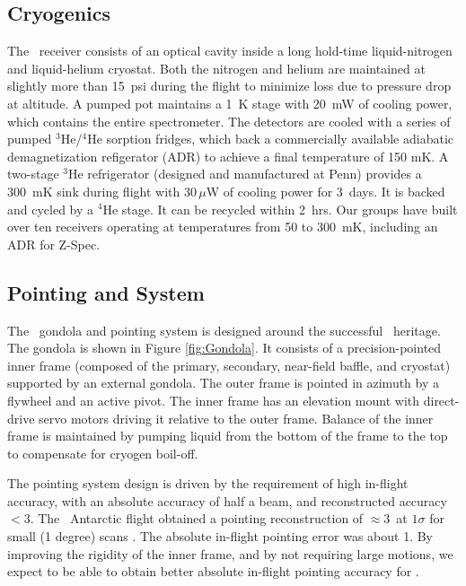 \subsection{Cryogenics} 
 
The \name\ receiver consists of an optical cavity inside a long
hold-time liquid-nitrogen and liquid-helium cryostat.  Both the
nitrogen and helium are maintained at slightly more than 15~psi during
the flight to minimize loss due to pressure drop at altitude.  A pumped pot maintains a 1~K stage with 20~mW of cooling power, which contains the entire spectrometer.  The detectors are cooled with a series of pumped $^3$He/$^4$He sorption fridges, which back a commercially available adiabatic demagnetization refigerator (ADR) to achieve a final temperature of 150 mK.
A two-stage $^3$He refrigerator (designed and manufactured at Penn) provides a
300~mK sink during flight with $30\,\mu$W of cooling power for 3~days.  It is backed and cycled by a $^4$He stage.  It can be recycled within
2~hrs.  Our groups have built over ten
receivers operating at temperatures from 50 to 300~mK, including an ADR for Z-Spec.

\subsection{Pointing and System} 
\label{sec:Observing} 

The \name\ gondola and pointing system is designed around the
successful \blast\ heritage.  The gondola is shown in Figure
\ref{fig:Gondola}.  It consists of a precision-pointed inner frame
(composed of the primary, secondary, near-field baffle, and cryostat)
supported by an external gondola.  The outer frame is pointed in
azimuth by a flywheel and an active pivot. The inner frame has an
elevation mount with direct-drive servo motors driving it relative to
the outer frame.  Balance of the inner frame is maintained by pumping
liquid from the bottom of the frame to the top to compensate for
cryogen boil-off.

The pointing system design is driven by the requirement of high
in-flight accuracy, with an absolute accuracy of half a beam, and
reconstructed accuracy $<$3\arcsec.  The \blast\ Antarctic flight
obtained a pointing reconstruction of $\approx 3$\arcsec\ at $1\sigma$
for small (1 degree) scans .  The absolute in-flight
pointing error was about 1\arcmin.  By improving the rigidity of the
inner frame, and by not requiring large motions, we expect to be able
to obtain better absolute in-flight pointing accuracy for \name.

